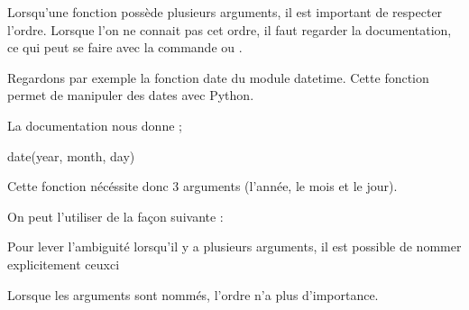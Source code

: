 \documentclass[letterpaper,10pt,english]{sphinxhowto}
\begin{document}
\sphinxAtStartPar
Lorsqu’une fonction possède plusieurs arguments, il est important de respecter l’ordre. Lorsque l’on ne connait pas cet ordre, il faut regarder la documentation, ce qui peut se faire avec la commande  ou .

\sphinxAtStartPar
Regardons par exemple la fonction date du module datetime. Cette fonction permet de manipuler des dates avec Python.

\begin{sphinxVerbatim}[commandchars=\\\{\}]
   
\end{sphinxVerbatim}

\sphinxAtStartPar
La documentation nous donne ;

\begin{sphinxVerbatim}[commandchars=\\\{\}]
date(year, month, day)
\end{sphinxVerbatim}

\sphinxAtStartPar
Cette fonction nécéssite donc 3 arguments (l’année, le mois et le jour).

\sphinxAtStartPar
On peut l’utiliser de la façon suivante :

\begin{sphinxVerbatim}[commandchars=\\\{\}]
    
\end{sphinxVerbatim}

\sphinxAtStartPar
Pour lever l’ambiguité lorsqu’il y a plusieurs arguments, il est possible de nommer explicitement ceux\sphinxhyphen{}ci

\begin{sphinxVerbatim}[commandchars=\\\{\}]
    
\end{sphinxVerbatim}

\sphinxAtStartPar
Lorsque les arguments sont nommés, l’ordre n’a plus d’importance.
\end{document}
